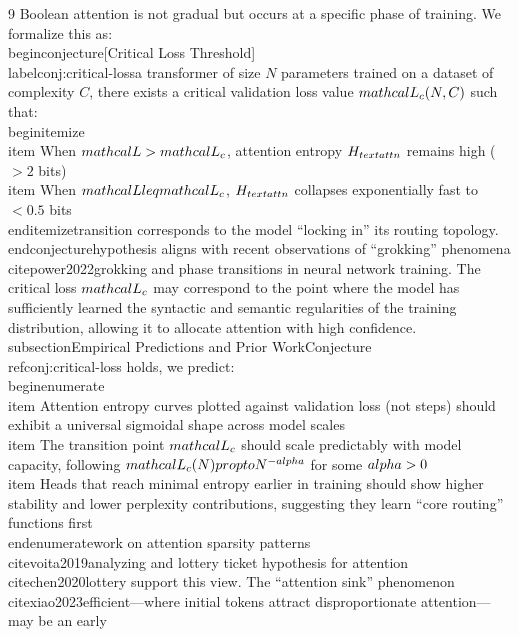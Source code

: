 \documentclass[11pt]{article}
\newtheorem{conjecture}[theorem]{Conjecture}
\theoremstyle{definition}
\begin{document}
\begin{thebibliography}{9}
Boolean attention is not gradual but occurs at a specific phase of training. We formalize this as:\n\n\\begin{conjecture}[Critical Loss Threshold]\n\\label{conj:critical-loss}\nFor a transformer of size $N$ parameters trained on a dataset of complexity $C$, there exists a critical validation loss value $\\mathcal{L}_c(N,C)$ such that:\n\\begin{itemize}\n\\item When $\\mathcal{L} > \\mathcal{L}_c$, attention entropy $H_{\\text{attn}}$ remains high ($> 2$ bits)\n\\item When $\\mathcal{L} \\leq \\mathcal{L}_c$, $H_{\\text{attn}}$ collapses exponentially fast to $< 0.5$ bits\n\\end{itemize}\nThis transition corresponds to the model ``locking in'' its routing topology.\n\\end{conjecture}\n\nThis hypothesis aligns with recent observations of ``grokking'' phenomena \\cite{power2022grokking} and phase transitions in neural network training. The critical loss $\\mathcal{L}_c$ may correspond to the point where the model has sufficiently learned the syntactic and semantic regularities of the training distribution, allowing it to allocate attention with high confidence.\n\n\\subsection{Empirical Predictions and Prior Work}\n\nIf Conjecture \\ref{conj:critical-loss} holds, we predict:\n\\begin{enumerate}\n\\item Attention entropy curves plotted against validation loss (not steps) should exhibit a universal sigmoidal shape across model scales\n\\item The transition point $\\mathcal{L}_c$ should scale predictably with model capacity, following $\\mathcal{L}_c(N) \\propto N^{-\\alpha}$ for some $\\alpha > 0$\n\\item Heads that reach minimal entropy earlier in training should show higher stability and lower perplexity contributions, suggesting they learn ``core routing'' functions first\n\\end{enumerate}\n\nPrior work on attention sparsity patterns \\cite{voita2019analyzing} and lottery ticket hypothesis for attention \\cite{chen2020lottery} support this view. The ``attention sink'' phenomenon \\cite{xiao2023efficient}---where initial tokens attract disproportionate attention---may be an early 
\end{thebibliography}
\end{document}
